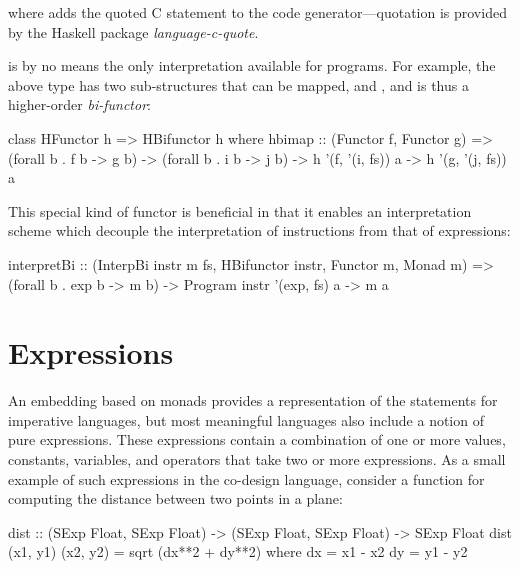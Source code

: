 \documentclass[../paper.tex]{subfiles}
\begin{document}

\noindent where  adds the quoted C statement to the code generator---quotation is provided by the Haskell package \textit{language-c-quote}.

 is by no means the only interpretation available for programs. For example, the above  type has two sub-structures that can be mapped,  and , and  is thus a higher-order \textit{bi-functor}:

\begin{code}
class HFunctor h => HBifunctor h where
  hbimap :: (Functor f, Functor g)
    => (forall b . f b -> g b)
    -> (forall b . i b -> j b)
    -> h '(f, '(i, fs)) a
    -> h '(g, '(j, fs)) a
\end{code}

\noindent This special kind of functor is beneficial in that it enables an interpretation scheme which decouple the interpretation of instructions from that of expressions:

\begin{code}
interpretBi :: (InterpBi instr m fs, HBifunctor instr, Functor m, Monad m)
  => (forall b . exp b -> m b) -> Program instr '(exp, fs) a -> m a
\end{code}

\section{Expressions}
\label{expr}

An embedding based on monads provides a representation of the statements for imperative languages, but most meaningful languages also include a notion of pure expressions. These expressions contain a combination of one or more values, constants, variables, and operators that take two or more expressions. As a small example of such expressions in the co-design language, consider a function for computing the distance between two points in a plane:

\begin{code}
dist :: (SExp Float, SExp Float) -> (SExp Float, SExp Float) -> SExp Float
dist (x1, y1) (x2, y2) = sqrt (dx**2 + dy**2)
  where
    dx = x1 - x2
    dy = y1 - y2
\end{code}
\end{document}
